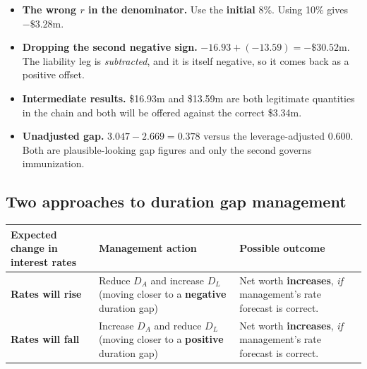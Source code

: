 \begin{lrtrapbox}
\begin{itemize}
\item \textbf{The wrong $r$ in the denominator.} Use the \textbf{initial} 8\%. Using 10\% gives $-\$3.28$m.
\item \textbf{Dropping the second negative sign.} $-16.93 + (-13.59) = -\$30.52$m. The liability leg is \emph{subtracted}, and it is itself negative, so it comes back as a positive offset.
\item \textbf{Intermediate results.} \$16.93m and \$13.59m are both legitimate quantities in the chain and both will be offered against the correct \$3.34m.
\item \textbf{Unadjusted gap.} $3.047 - 2.669 = 0.378$ versus the leverage-adjusted $0.600$. Both are plausible-looking gap figures and only the second governs immunization.
\end{itemize}
\end{lrtrapbox}

\subsection{Two approaches to duration gap management}

\begin{center}
\small
\begin{tabularx}{\textwidth}{@{}p{3.2cm} p{4.3cm} X@{}}
\toprule
\rowcolor{FRMSoft}\textbf{Expected change in interest rates} & \textbf{Management action} & \textbf{Possible outcome} \\
\midrule
\textbf{Rates will rise} & Reduce $D_A$ and increase $D_L$ \newline (moving closer to a \textbf{negative} duration gap) & Net worth \textbf{increases}, \emph{if} management's rate forecast is correct. \\
\addlinespace
\textbf{Rates will fall} & Increase $D_A$ and reduce $D_L$ \newline (moving closer to a \textbf{positive} duration gap) & Net worth \textbf{increases}, \emph{if} management's rate forecast is correct. \\
\bottomrule
\end{tabularx}
\end{center}

